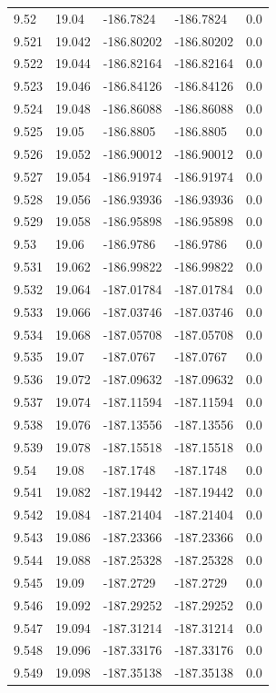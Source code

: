 \begin{tabular}{lllll}
9.52 & 19.04 & -186.7824 & -186.7824 & 0.0 \\
9.521 & 19.042 & -186.80202 & -186.80202 & 0.0 \\
9.522 & 19.044 & -186.82164 & -186.82164 & 0.0 \\
9.523 & 19.046 & -186.84126 & -186.84126 & 0.0 \\
9.524 & 19.048 & -186.86088 & -186.86088 & 0.0 \\
9.525 & 19.05 & -186.8805 & -186.8805 & 0.0 \\
9.526 & 19.052 & -186.90012 & -186.90012 & 0.0 \\
9.527 & 19.054 & -186.91974 & -186.91974 & 0.0 \\
9.528 & 19.056 & -186.93936 & -186.93936 & 0.0 \\
9.529 & 19.058 & -186.95898 & -186.95898 & 0.0 \\
9.53 & 19.06 & -186.9786 & -186.9786 & 0.0 \\
9.531 & 19.062 & -186.99822 & -186.99822 & 0.0 \\
9.532 & 19.064 & -187.01784 & -187.01784 & 0.0 \\
9.533 & 19.066 & -187.03746 & -187.03746 & 0.0 \\
9.534 & 19.068 & -187.05708 & -187.05708 & 0.0 \\
9.535 & 19.07 & -187.0767 & -187.0767 & 0.0 \\
9.536 & 19.072 & -187.09632 & -187.09632 & 0.0 \\
9.537 & 19.074 & -187.11594 & -187.11594 & 0.0 \\
9.538 & 19.076 & -187.13556 & -187.13556 & 0.0 \\
9.539 & 19.078 & -187.15518 & -187.15518 & 0.0 \\
9.54 & 19.08 & -187.1748 & -187.1748 & 0.0 \\
9.541 & 19.082 & -187.19442 & -187.19442 & 0.0 \\
9.542 & 19.084 & -187.21404 & -187.21404 & 0.0 \\
9.543 & 19.086 & -187.23366 & -187.23366 & 0.0 \\
9.544 & 19.088 & -187.25328 & -187.25328 & 0.0 \\
9.545 & 19.09 & -187.2729 & -187.2729 & 0.0 \\
9.546 & 19.092 & -187.29252 & -187.29252 & 0.0 \\
9.547 & 19.094 & -187.31214 & -187.31214 & 0.0 \\
9.548 & 19.096 & -187.33176 & -187.33176 & 0.0 \\
9.549 & 19.098 & -187.35138 & -187.35138 & 0.0 \\

\end{tabular}
